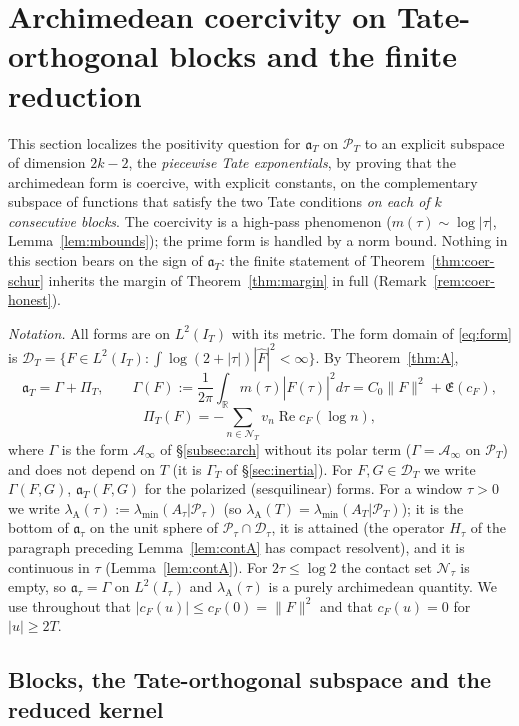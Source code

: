 \documentclass[11pt]{amsart}
\theoremstyle{definition}
\theoremstyle{remark}
\newcommand{\R}{\mathbb R}
\newcommand{\Rel}{\operatorname{Re}}
\newcommand{\PT}{\mathcal P_T}
\newcommand{\IT}{I_T}
\newcommand{\lamA}{\lambda_{\min}(A_T|\PT)}
\newcommand{\Fh}{\widehat F}
\newcommand{\cF}{c_F}
\newcommand{\Lev}{\mathfrak E}
\newcommand{\NT}{\mathcal N_T}
\newcommand{\Ainf}{\mathcal A_\infty}
\newcommand{\PiT}{\Pi_T}
\begin{document}
\section{Archimedean coercivity on Tate-orthogonal blocks and the finite reduction}\label{sec:coer}

This section localizes the positivity question for $\mathfrak a_T$ on $\PT$ to an explicit
subspace of dimension $2k-2$, the \emph{piecewise Tate exponentials}, by proving that the
archimedean form is coercive, with explicit constants, on the complementary subspace of functions
that satisfy the two Tate conditions \emph{on each of $k$ consecutive blocks}. The coercivity is a
high-pass phenomenon ($m(\tau)\sim\log|\tau|$, Lemma~\ref{lem:mbounds}); the prime form is handled
by a norm bound. Nothing in this section bears on the sign of $\mathfrak a_T$: the finite statement
of Theorem~\ref{thm:coer-schur} inherits the margin of Theorem~\ref{thm:margin} in full
(Remark~\ref{rem:coer-honest}).

\emph{Notation.} All forms are on $L^2(\IT)$ with its metric. The form domain of \eqref{eq:form} is
$\mathcal D_T=\{F\in L^2(\IT):\int\log(2+|\tau|)|\Fh|^2<\infty\}$. By Theorem~\ref{thm:A},
\[
\mathfrak a_T=\Gamma+\PiT,\qquad
\Gamma(F):=\frac1{2\pi}\int_\R m(\tau)|\Fh(\tau)|^2d\tau=C_0\|F\|^2+\Lev(\cF),
\]
\[
\PiT(F)=-\sum_{n\in\NT}v_n\Rel\cF(\log n),
\]
where $\Gamma$ is the form $\Ainf$ of \S\ref{subsec:arch} without its polar term ($\Gamma=\Ainf$ on
$\PT$) and does not depend on $T$ (it is $\Gamma_T$ of \S\ref{sec:inertia}). For $F,G\in\mathcal D_T$ we write $\Gamma(F,G)$,
$\mathfrak a_T(F,G)$ for the polarized (sesquilinear) forms. For a window $\tau>0$ we write
$\lambda_{\mathrm A}(\tau):=\lambda_{\min}(A_\tau|\mathcal P_\tau)$ (so $\lambda_{\mathrm A}(T)=\lamA$);
it is the bottom of $\mathfrak a_\tau$ on the unit sphere of $\mathcal P_\tau\cap\mathcal D_\tau$, it is
attained (the operator $H_\tau$ of the paragraph preceding Lemma~\ref{lem:contA} has compact
resolvent), and it is continuous in $\tau$ (Lemma~\ref{lem:contA}). For $2\tau\le\log2$ the contact
set $\mathcal N_\tau$ is empty, so $\mathfrak a_\tau=\Gamma$ on $L^2(I_\tau)$ and
$\lambda_{\mathrm A}(\tau)$ is a purely archimedean quantity. We use throughout that
$|\cF(u)|\le\cF(0)=\|F\|^2$ and that $\cF(u)=0$ for $|u|\ge2T$.

\subsection{Blocks, the Tate-orthogonal subspace and the reduced kernel}\label{subsec:coer-blocks}
\end{document}
